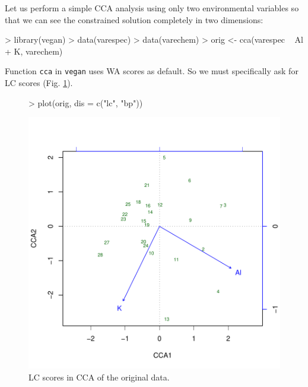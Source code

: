 \documentclass[a4paper]{article}
\begin{document}
Let us perform a simple CCA analysis using only two environmental
variables so that we can see the constrained solution completely in
two dimensions:
\begin{Schunk}
\begin{Sinput}
> library(vegan)
> data(varespec)
> data(varechem)
> orig <- cca(varespec ~ Al + K, varechem)
\end{Sinput}
\end{Schunk}
Function \texttt{cca} in \texttt{vegan} uses WA scores as
default. So we must specifically ask for LC scores
(Fig. \ref{fig:ccalc}).
\begin{figure}
\begin{center}
\begin{Schunk}
\begin{Sinput}
> plot(orig, dis = c("lc", "bp"))
\end{Sinput}
\end{Schunk}
\includegraphics{vegan-FAQ-002}
\caption{LC scores in CCA of the original data.}
\label{fig:ccalc}
\end{center}
\end{figure}
\end{document}
